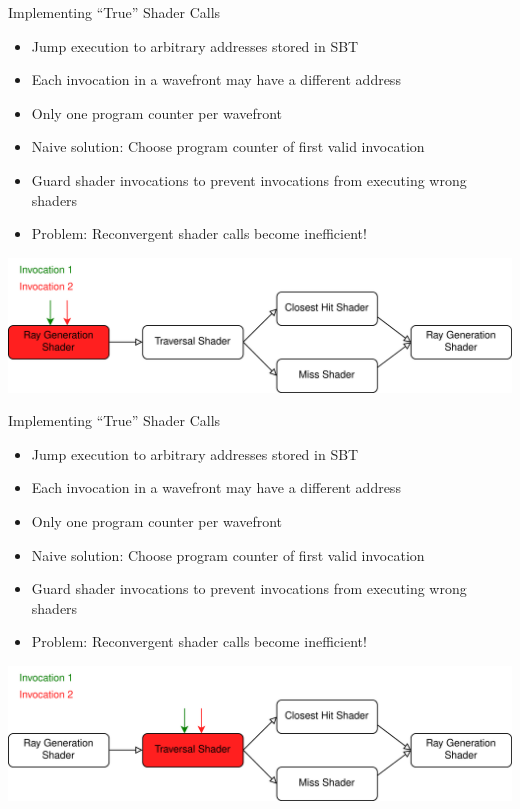 \documentclass[aspectratio=169,t]{beamer}
\begin{document}
\begin{slide}{Implementing ``True'' Shader Calls}
 \begin{itemize}
  \item Jump execution to arbitrary addresses stored in SBT
  \item Each invocation in a wavefront may have a different address
  \item Only one program counter per wavefront
  \item Naive solution: Choose program counter of first valid invocation
  \item Guard shader invocations to prevent invocations from executing wrong shaders
  \item Problem: Reconvergent shader calls become inefficient!
 \end{itemize}
 \pause
 \includegraphics[width=\textwidth]{graphics/RTStages2-1.png}
\end{slide}

\begin{slide}{Implementing ``True'' Shader Calls}
 \begin{itemize}
  \item Jump execution to arbitrary addresses stored in SBT
  \item Each invocation in a wavefront may have a different address
  \item Only one program counter per wavefront
  \item Naive solution: Choose program counter of first valid invocation
  \item Guard shader invocations to prevent invocations from executing wrong shaders
  \item Problem: Reconvergent shader calls become inefficient!
 \end{itemize}
 \includegraphics[width=\textwidth]{graphics/RTStages2-2.png}
\end{slide}
\end{document}
